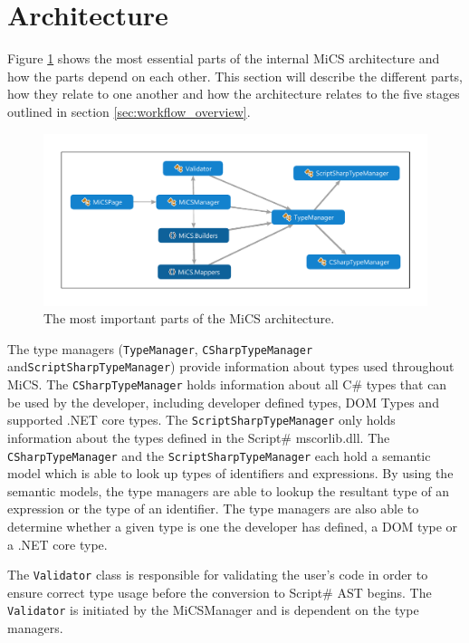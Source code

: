 \section{Architecture} %
\label{sec:architecture}
Figure \ref{fig:dependencygraph} shows the most essential parts of the internal MiCS architecture and how the parts depend on each other. 
This section will describe the different parts, how they relate to one another and how the architecture relates to the five stages outlined in section \ref{sec:workflow_overview}. 

\begin{figure}
	\begin{center}
		\centerline{\includegraphics[width=15cm]{resources/images/architecture.pdf}}
	\end{center}
	\caption{The most important parts of the MiCS architecture.}
	\label{fig:dependencygraph}
\end{figure}


The type managers (\texttt{TypeManager}, \texttt{CSharpTypeManager} and\newline \texttt{ScriptSharpTypeManager}) provide information about types used throughout MiCS. The \texttt{CSharpTypeManager} holds information about all C\# types that can be used by the developer, including developer defined types, DOM Types and supported .NET core types. The \texttt{ScriptSharpTypeManager} only holds information about the types defined in the Script\# mscorlib.dll. The \texttt{CSharpTypeManager} and the \texttt{ScriptSharpTypeManager} each hold a semantic model which is able to look up types of identifiers and expressions. By using the semantic models, the type managers are able to lookup the resultant type of an expression or the type of an identifier. The type managers are also able to determine whether a given type is one the developer has defined, a DOM type or a .NET core type.

The \texttt{Validator} class is responsible for validating the user's code in order to ensure correct type usage before the conversion to Script\# AST begins. The \texttt{Validator} is initiated by the MiCSManager and is dependent on the type managers.

